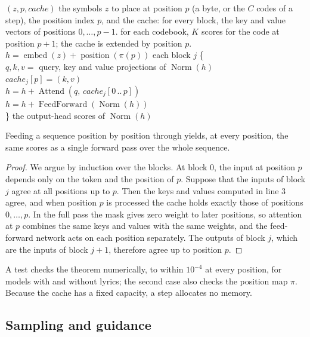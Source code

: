 \begin{procedure}{$(z, p, \mathit{cache})$}
{the symbols $z$ to place at position $p$ (a byte, or the $C$ codes of a step),
the position index $p$, and the cache: for every block, the key and value
vectors of positions $0, \dots, p - 1$.}
{for each codebook, $K$ scores for the code at position $p + 1$; the cache is
extended by position $p$.}
\li $h = \operatorname{embed}(z) + \operatorname{position}(\pi(p))$ \groupend
\li {} each block $j$ \{ \\
\li \> $q, k, v = $ query, key and value projections of $\operatorname{Norm}(h)$ \\
\li \> $\mathit{cache}_j[p] = (k, v)$ \\
\li \> $h = h + \operatorname{Attend}(q,\, \mathit{cache}_j[0 \,..\, p])$ \\
\li \> $h = h + \operatorname{FeedForward}(\operatorname{Norm}(h))$ \\
\li \} \groupend
\li {} the output-head scores of $\operatorname{Norm}(h)$
\end{procedure}

\begin{theorem}
Feeding a sequence position by position through  yields, at
every position, the same scores as a single forward pass over the whole
sequence.
\end{theorem}
\begin{proof}
We argue by induction over the blocks. At block 0, the input at position $p$
depends only on the token and the position of $p$. Suppose that the inputs of
block $j$ agree at all positions up to $p$. Then the keys and values computed in
line 3 agree, and when position $p$ is processed the cache holds exactly those
of positions $0, \dots, p$. In the full pass the mask gives zero weight to later
positions, so attention at $p$ combines the same keys and values with the same
weights, and the feed-forward network acts on each position separately. The
outputs of block $j$, which are the inputs of block $j + 1$, therefore agree up
to position $p$.
\end{proof}

A test checks the theorem numerically, to within $10^{-4}$ at every position,
for models with and without lyrics; the second case also checks the position
map $\pi$. Because the cache has a fixed capacity, a step allocates no memory.

\subsection{Sampling and guidance}

